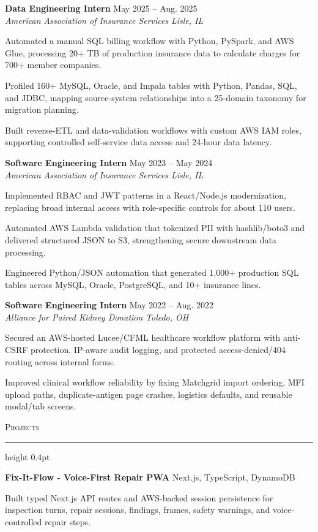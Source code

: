 \documentclass[letterpaper,11pt]{article}
\newcommand{\resumesection}[1]{%
  \par\vspace{2pt}%
  {\large\scshape #1}\par\vspace{2pt}%
  \hrule height 0.4pt\vspace{2pt}%
}
\newcommand{\resumeSubheading}[4]{
  \textbf{#1} \hfill #2\\
  \textit{#3} \hfill \textit{#4}
}
\newcommand{\projectHeading}[2]{
  \textbf{#1} \hfill #2
}
\begin{document}
\resumeSubheading
{Data Engineering Intern}{May 2025 -- Aug. 2025}
{American Association of Insurance Services}{Lisle, IL}
\begin{tightitemize}
  \item Automated a manual SQL billing workflow with Python, PySpark, and AWS Glue, processing 20+ TB of production insurance data to calculate charges for 700+ member companies.
  \item Profiled 160+ MySQL, Oracle, and Impala tables with Python, Pandas, SQL, and JDBC, mapping source-system relationships into a 25-domain taxonomy for migration planning.
  \item Built reverse-ETL and data-validation workflows with custom AWS IAM roles, supporting controlled self-service data access and 24-hour data latency.
\end{tightitemize}

\resumeSubheading
{Software Engineering Intern}{May 2023 -- May 2024}
{American Association of Insurance Services}{Lisle, IL}
\begin{tightitemize}
  \item Implemented RBAC and JWT patterns in a React/Node.js modernization, replacing broad internal access with role-specific controls for about 110 users.
  \item Automated AWS Lambda validation that tokenized PII with hashlib/boto3 and delivered structured JSON to S3, strengthening secure downstream data processing.
  \item Engineered Python/JSON automation that generated 1,000+ production SQL tables across MySQL, Oracle, PostgreSQL, and 10+ insurance lines.
\end{tightitemize}

\resumeSubheading
{Software Engineering Intern}{May 2022 -- Aug. 2022}
{Alliance for Paired Kidney Donation}{Toledo, OH}
\begin{tightitemize}
  \item Secured an AWS-hosted Lucee/CFML healthcare workflow platform with anti-CSRF protection, IP-aware audit logging, and protected access-denied/404 routing across internal forms.
  \item Improved clinical workflow reliability by fixing Matchgrid import ordering, MFI upload paths, duplicate-antigen page crashes, logistics defaults, and reusable modal/tab screens.
\end{tightitemize}

\resumesection{Projects}
\projectHeading{Fix-It-Flow - Voice-First Repair PWA}{Next.js, TypeScript, DynamoDB}
\begin{tightitemize}
  \item Built typed Next.js API routes and AWS-backed session persistence for inspection turns, repair sessions, findings, frames, safety warnings, and voice-controlled repair steps.
\end{tightitemize}
\end{document}
